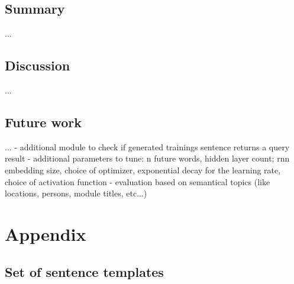 \section{Summary}\label{c.conclusion.summary}
...

\section{Discussion}\label{c.conclusion.discussion}
...

\section{Future work}\label{c.conclusion.future}
...
- additional module to check if generated trainings sentence returns a query result
- additional parameters to tune: n future words, hidden layer count; rnn embedding size, choice of optimizer, exponential decay for the learning rate, choice of activation function
- evaluation based on semantical topics (like locations, persons, module titles, etc...)

\cite{mueller2015}




\appendix
\chapter{Appendix}\label{c.appendix}

\section{Set of sentence templates}\label{c.appendix.sentencetemplates}


